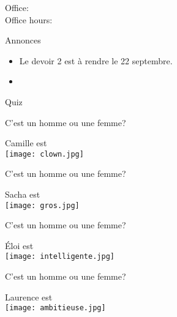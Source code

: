 \documentclass{beamer}
\subtitle[Traits et questions]{Encore les traits et les questions}
\begin{document}
  \begin{frame}
    \titlepage
    \tiny{Office: \\
          Office hours: }
  \end{frame}

  \begin{frame}{Annonces}
    \begin{itemize}
      \item Le devoir 2 est à rendre le 22 septembre.
      \item[] 
    \end{itemize}
  \end{frame}

  \begin{frame}{}
    \begin{center}
      \Large Quiz
    \end{center}
  \end{frame}

  \begin{frame}{C'est un homme ou une femme?}
    \begin{center}
      Camille est \underline{} \\
      \texttt{[image: clown.jpg]}
    \end{center}
  \end{frame}

  \begin{frame}{C'est un homme ou une femme?}
    \begin{center}
      Sacha est \underline{} \\
      \texttt{[image: gros.jpg]}
    \end{center}
  \end{frame}

  \begin{frame}{C'est un homme ou une femme?}
    \begin{center}
      Éloi est \underline{} \\
      \texttt{[image: intelligente.jpg]}
    \end{center}
  \end{frame}

  \begin{frame}{C'est un homme ou une femme?}
    \begin{center}
      Laurence est \underline{} \\
      \texttt{[image: ambitieuse.jpg]}
    \end{center}
  \end{frame}
\end{document}
